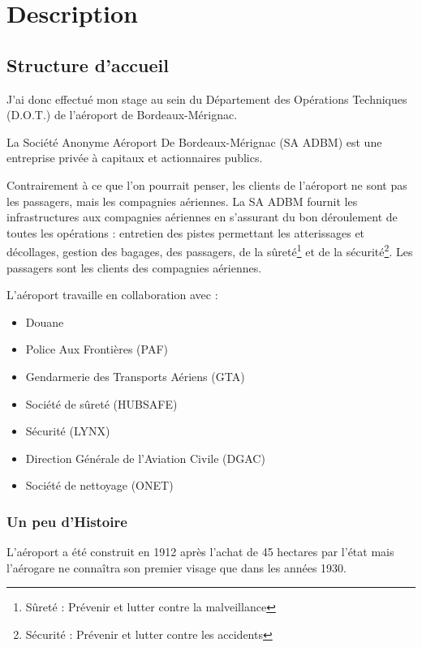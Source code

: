 \chapter{Description}

\section{Structure d'accueil}

J’ai donc effectué mon stage au sein du Département des Opérations Techniques (D.O.T.) de l’aéroport de Bordeaux-Mérignac.

La Société Anonyme Aéroport De Bordeaux-Mérignac (SA ADBM) est une entreprise privée à capitaux et actionnaires publics.\newline

Contrairement à ce que l’on pourrait penser, les clients de l’aéroport ne sont pas les passagers, mais les compagnies aériennes. La SA ADBM fournit les infrastructures aux compagnies aériennes en s’assurant du bon déroulement de toutes les opérations : entretien des pistes permettant les atterissages et décollages, gestion des bagages, des passagers, de la sûreté\footnote{Sûreté : Prévenir et lutter contre la malveillance} et de la sécurité\footnote{Sécurité : Prévenir et lutter contre les accidents}. Les passagers sont les clients des compagnies aériennes.\newline

L’aéroport travaille en collaboration avec :


\begin{itemize}
  \item Douane
  \item Police Aux Frontières (PAF)
  \item Gendarmerie des Transports Aériens (GTA)
  \item Société de sûreté (HUBSAFE)
  \item Sécurité (LYNX)
  \item Direction Générale de l'Aviation Civile (DGAC)
  \item Société de nettoyage (ONET)\newline
\end{itemize}


\subsection{Un peu d'Histoire}

L'aéroport a été construit en 1912 après l'achat de 45 hectares par l'état mais l'aérogare ne connaîtra son premier visage que dans les années 1930.

